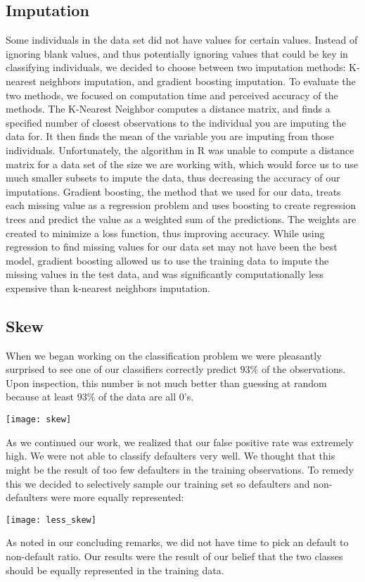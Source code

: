 \documentclass[11pt, oneside]{article}   	%
\begin{document}
	
	
	\subsection{Imputation}
	Some individuals in the data set did not have values for certain values. 
	Instead of ignoring blank values, and thus potentially ignoring values that could be key in 
	classifying individuals, we decided to choose between two imputation methods: K-nearest 
	neighbors imputation, and gradient boosting imputation. To evaluate the two methods, we 
	focused on computation time and perceived accuracy of the methods. The K-Nearest Neighbor 
	computes a distance matrix, and finds a specified number of closest observations to the 
	individual you are imputing the data for. It then finds the mean of the variable you are imputing 
	from those individuals. Unfortunately, the algorithm in R was unable to compute a distance
	matrix for a data set of the size we are working with, which would force us to use much smaller
	subsets to impute the data, thus decreasing the accuracy of our imputations. Gradient
	boosting, the method that we used for our data, treats each missing value as a regression
	problem and uses boosting to create regression trees and predict the value as a weighted
	sum of the predictions. The weights are created to minimize a loss function, thus improving
	accuracy. While using regression to find missing values for our data set may not have been
	the best model, gradient boosting allowed us to use the training data to impute the missing 
	values in the test data, and was significantly computationally less expensive than k-nearest
	neighbors imputation. 
	
	\subsection{Skew}
	When we began working on the classification problem we were pleasantly surprised to see
	one of our classifiers correctly predict $93\%$ of the observations. Upon inspection,
	this number is not much better than guessing at random because at least $93\%$ of the
	data are all $0$'s.
	\begin{center}
	\texttt{[image: skew]}
	\end{center}  
	As we continued our work, we realized that our false positive rate was extremely high. We
	were not able to classify defaulters very well. We thought that this might be the result of 
	too few defaulters in the training observations. To remedy this we decided to selectively
	sample our training set so defaulters and non-defaulters were more equally represented:
	\begin{center}
	\texttt{[image: less\_skew]}
	\end{center}
	As noted in our concluding remarks, we did not have time to pick an default to non-default
	ratio. Our results were the result of our belief that the two classes should be equally
	represented in the training data.
\end{document}
